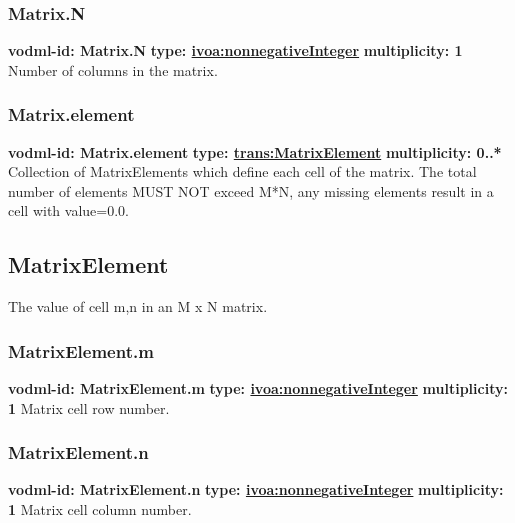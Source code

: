     \subsubsection{Matrix.N}
      \textbf{vodml-id: Matrix.N} \newline
      \textbf{type: \hyperref[sect:ivoa]{ivoa:nonnegativeInteger}} \newline
      \textbf{multiplicity: 1} \newline 
      Number of columns in the matrix.

    \subsubsection{Matrix.element}
      \textbf{vodml-id: Matrix.element} \newline
      \textbf{type: \hyperref[sect:MatrixElement]{trans:MatrixElement}} \newline
      \textbf{multiplicity: 0..*} \newline 
      Collection of MatrixElements which define each cell of the matrix. The total number of elements MUST NOT exceed M*N, any missing elements result in a cell with value=0.0.

  \subsection{MatrixElement}
  \label{sect:MatrixElement}
    The value of cell m,n in an M x N matrix.

    \subsubsection{MatrixElement.m}
      \textbf{vodml-id: MatrixElement.m} \newline
      \textbf{type: \hyperref[sect:ivoa]{ivoa:nonnegativeInteger}} \newline
      \textbf{multiplicity: 1} \newline 
      Matrix cell row number.

    \subsubsection{MatrixElement.n}
      \textbf{vodml-id: MatrixElement.n} \newline
      \textbf{type: \hyperref[sect:ivoa]{ivoa:nonnegativeInteger}} \newline
      \textbf{multiplicity: 1} \newline 
      Matrix cell column number.

